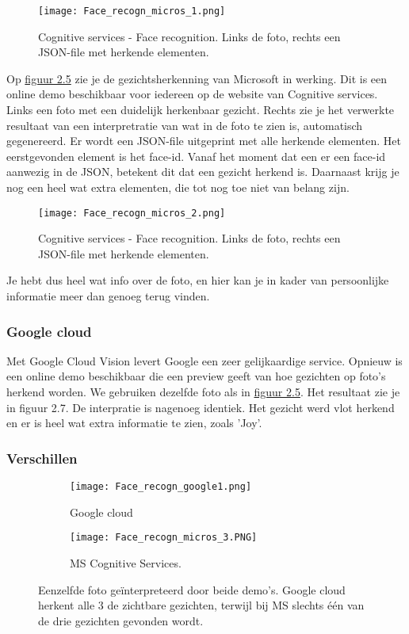 \begin{figure}[h]
    \texttt{[image: Face\_recogn\_micros\_1.png]}
    \caption{Cognitive services - Face recognition. Links de foto, rechts een JSON-file met herkende elementen.}
    \label{fig:cognitive}
\end{figure}

Op \hyperref[fig:cognitive]{figuur 2.5} zie je de gezichtsherkenning van Microsoft in werking. Dit is een online demo beschikbaar voor iedereen op de website van Cognitive services. Links een foto met een duidelijk herkenbaar gezicht. Rechts zie je het verwerkte resultaat van een interpretratie van wat in de foto te zien is, automatisch gegenereerd. Er wordt een JSON-file uitgeprint met alle herkende elementen. Het eerstgevonden element is het face-id. Vanaf het moment dat een er een face-id aanwezig in de JSON, betekent dit dat een gezicht herkend is. Daarnaast krijg je nog een heel wat extra elementen, die tot nog toe niet van belang zijn. 



\begin{figure}[h]
    \texttt{[image: Face\_recogn\_micros\_2.png]}
    \caption{Cognitive services - Face recognition. Links de foto, rechts een JSON-file met herkende elementen.}
    \label{fig:cognitive2}
\end{figure}

Je hebt dus heel wat info over de foto, en hier kan je in kader van persoonlijke informatie meer dan genoeg terug vinden. 

\subsubsection{Google cloud}
Met Google Cloud Vision levert Google een zeer gelijkaardige service. Opnieuw is een online demo beschikbaar die een preview geeft van hoe gezichten op foto's herkend worden. We gebruiken dezelfde foto als in \hyperref[fig:cognitive2]{figuur 2.5}. Het resultaat zie je in figuur 2.7. De interpratie is nagenoeg identiek. Het gezicht werd vlot herkend en er is heel wat extra informatie te zien, zoals 'Joy'. 

\subsubsection{Verschillen}
\begin{figure}[h]
	\centering
	\begin{subfigure}{0.45\textwidth}
		\centering
		\texttt{[image: Face\_recogn\_google1.png]}
		\caption{Google cloud}
		\label{fig:sub1}
	\end{subfigure}%
	\begin{subfigure}{0.45\textwidth}
		\centering
		\texttt{[image: Face\_recogn\_micros\_3.PNG]}
		\caption{MS Cognitive Services.}
		\label{fig:sub2}
	\end{subfigure}
	\caption{Eenzelfde foto geïnterpreteerd door beide demo's. Google cloud herkent alle 3 de zichtbare gezichten, terwijl bij MS slechts één van de drie gezichten gevonden wordt.}
	\label{fig:test}
\end{figure}


